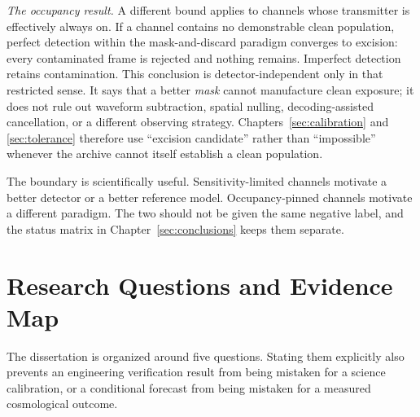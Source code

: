 \emph{The occupancy result.} A different bound applies to channels whose transmitter is effectively always on. If a channel contains no demonstrable clean population, perfect detection within the mask-and-discard paradigm converges to excision: every contaminated frame is rejected and nothing remains. Imperfect detection retains contamination. This conclusion is detector-independent only in that restricted sense. It says that a better \emph{mask} cannot manufacture clean exposure; it does not rule out waveform subtraction, spatial nulling, decoding-assisted cancellation, or a different observing strategy. Chapters~\ref{sec:calibration} and \ref{sec:tolerance} therefore use ``excision candidate'' rather than ``impossible'' whenever the archive cannot itself establish a clean population.

The boundary is scientifically useful. Sensitivity-limited channels motivate a better detector or a better reference model. Occupancy-pinned channels motivate a different paradigm. The two should not be given the same negative label, and the status matrix in Chapter~\ref{sec:conclusions} keeps them separate.

\section{Research Questions and Evidence Map}
\label{sec:intro:questions}

The dissertation is organized around five questions.  Stating them explicitly
also prevents an engineering verification result from being mistaken for a
science calibration, or a conditional forecast from being mistaken for a
measured cosmological outcome.

